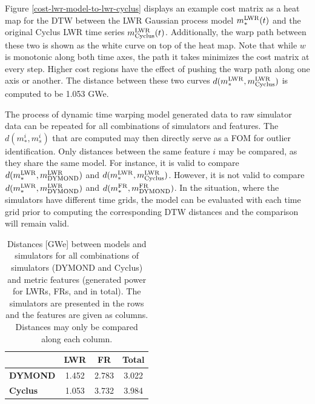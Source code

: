 Figure \ref{cost-lwr-model-to-lwr-cyclus} displays an example cost matrix 
as a heat map for the DTW between the LWR Gaussian process model 
$m_*^{\mathrm{LWR}}(t)$ and the original Cyclus LWR time series $m_{\mathrm{Cyclus}}^{\mathrm{LWR}}(t)$.
Additionally, the warp path between these two is shown as the white curve
on top of the heat map. Note that while $w$ is monotonic along both time axes, the
path it takes minimizes the cost matrix at every step. Higher cost regions
have the effect of pushing the warp path along one axis or another. The 
distance between these two curves $d(m_*^{\mathrm{LWR}}, m_{\mathrm{Cyclus}}^{\mathrm{LWR}})$ is computed 
to be 1.053 GWe.

The process of dynamic time warping model generated data to raw simulator data can be 
repeated for all combinations of simulators and features. The 
$d(m_*^i, m_s^i)$ that are computed may then directly serve as a FOM for
outlier identification. Only distances between the same feature $i$ may be compared,
as they share the same model. For instance, it is valid to compare
$d(m_*^{\mathrm{LWR}}, m_{\mathrm{DYMOND}}^{\mathrm{LWR}})$ and $d(m_*^{\mathrm{LWR}}, m_{\mathrm{Cyclus}}^{\mathrm{LWR}})$. However,  
it is not valid to compare $d(m_*^{\mathrm{LWR}}, m_{\mathrm{DYMOND}}^{\mathrm{LWR}})$ and 
$d(m_*^{\mathrm{FR}}, m_{\mathrm{DYMOND}}^{\mathrm{FR}})$.  In the situation, where the simulators 
have different time grids, the model can be evaluated with each time grid
prior to computing the corresponding DTW distances and the comparison will
remain valid.

\begin{table}[htb]
\centering
\caption{Distances [GWe] between models and simulators for all combinations of 
simulators (DYMOND and Cyclus) and metric features (generated power for 
LWRs, FRs, and in total). The simulators are presented in the rows and the
features are given as columns. Distances may only be compared along 
each column.}
\label{d-compare}
\begin{tabular}{l||c||c||c|}
                & \textbf{LWR} & \textbf{FR} & \textbf{Total} \\
\hline
\textbf{DYMOND} & 1.452        & 2.783       & 3.022          \\
\hline
\textbf{Cyclus} & 1.053        & 3.732       & 3.984          \\
\hline
\end{tabular}
\end{table}

